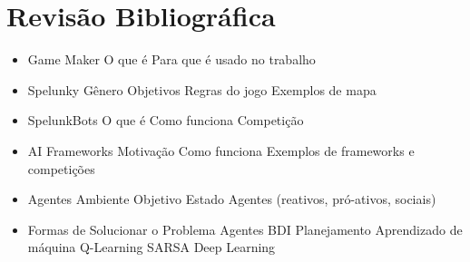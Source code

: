 \chapter{\label{chap:lit-review}Revisão Bibliográfica}

\begin{itemize}
    \item Game Maker
        \subitem O que é
        \subitem Para que é usado no trabalho
    \item Spelunky
        \subitem Gênero
        \subitem Objetivos
        \subitem Regras do jogo
        \subitem Exemplos de mapa
    \item SpelunkBots
        \subitem O que é
        \subitem Como funciona
        \subitem Competição
    \item AI Frameworks
        \subitem Motivação
        \subitem Como funciona
        \subitem Exemplos de frameworks e competições
    \item Agentes
        \subitem Ambiente
        \subitem Objetivo
        \subitem Estado
        \subitem Agentes (reativos, pró-ativos, sociais)
    \item Formas de Solucionar o Problema
        \subitem Agentes BDI
        \subitem Planejamento
        \subitem Aprendizado de máquina
            \subitem Q-Learning
            \subitem SARSA
            \subitem Deep Learning
\end{itemize}

